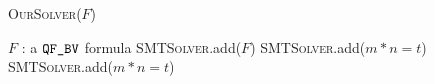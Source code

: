 \begin{algorithm}[t]
 \caption{\textsc{OurSolver}($F$)}
 \label{alg:solver}
 \begin{algorithmic}[1]
   \Ensure $F$ : a $\texttt{QF\_BV}$ formula
   \State \textsc{SMTSolver}.add($F$)
   \State \textsc{SMTSolver}.add($m*n = t$)
   \EndFor
   \EndIf
   \State \textsc{SMTSolver}.add($m*n = t$)
   \EndFor
   \EndIf
   \EndFor
   \State {}
 \end{algorithmic}
\end{algorithm}  


